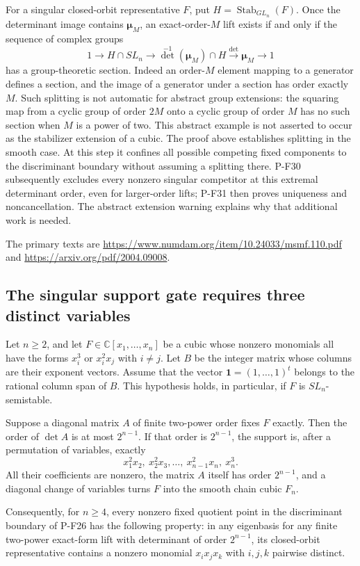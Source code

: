 For a singular closed-orbit representative $F$, put
$H=\operatorname{Stab}_{GL_n}(F)$. Once the determinant image
contains $\boldsymbol\mu_M$, an exact-order-$M$ lift exists
if and only if the sequence of complex groups
\[
 1\longrightarrow H\cap SL_n\longrightarrow
   \det^{-1}(\boldsymbol\mu_M)\cap H
   \xrightarrow{\det}\boldsymbol\mu_M\longrightarrow1
 \tag{P-F26g}
\]
has a group-theoretic section. Indeed an order-$M$ element
mapping to a generator defines a section, and the image
of a generator under a section has order exactly $M$.
Such splitting is not automatic for abstract group extensions:
the squaring map from a cyclic group of order $2M$ onto a
cyclic group of order $M$ has no such section when $M$ is a
power of two. This abstract example is not asserted to occur
as the stabilizer extension of a cubic. The proof above
establishes splitting in the smooth case. At this step it
confines all possible competing fixed components to the
discriminant boundary without assuming a splitting there.
P-F30 subsequently excludes every nonzero singular competitor
at this extremal determinant order, even for larger-order lifts;
P-F31 then proves uniqueness and noncancellation. The abstract
extension warning explains why that additional work is needed.

The primary texts are
\url{https://www.numdam.org/item/10.24033/msmf.110.pdf}
and \url{https://arxiv.org/pdf/2004.09008}.



\subsection{The singular support gate requires three distinct variables}

\begin{proposition}
\label{prop:cubicgraphsupport}
Let $n\ge2$, and let $F\in\mathbb C[x_1,\ldots,x_n]$ be a
cubic whose nonzero monomials all have the forms $x_i^3$ or
$x_i^2x_j$ with $i\ne j$. Let $B$ be the integer matrix whose
columns are their exponent vectors. Assume that the vector
$\mathbf1=(1,\ldots,1)^t$ belongs to the rational column span
of $B$. This hypothesis holds, in particular, if $F$ is
$SL_n$-semistable.

Suppose a diagonal matrix $A$ of finite two-power order fixes
$F$ exactly. Then the order of $\det A$ is at most $2^{n-1}$.
If that order is $2^{n-1}$, the support is, after a permutation
of variables, exactly
\[
 x_1^2x_2,\ x_2^2x_3,\ldots,\ x_{n-1}^2x_n,\ x_n^3.
 \tag{P-F27a}
\]
All their coefficients are nonzero, the matrix $A$ itself has
order $2^{n-1}$, and a diagonal change of variables turns $F$
into the smooth chain cubic $F_n$.

Consequently, for $n\ge4$, every nonzero fixed quotient point
in the discriminant boundary of P-F26 has the following
property: in any eigenbasis for any finite two-power
exact-form lift with determinant of order $2^{n-1}$, its
closed-orbit representative contains a nonzero monomial
$x_ix_jx_k$ with $i,j,k$ pairwise distinct.
\end{proposition}

